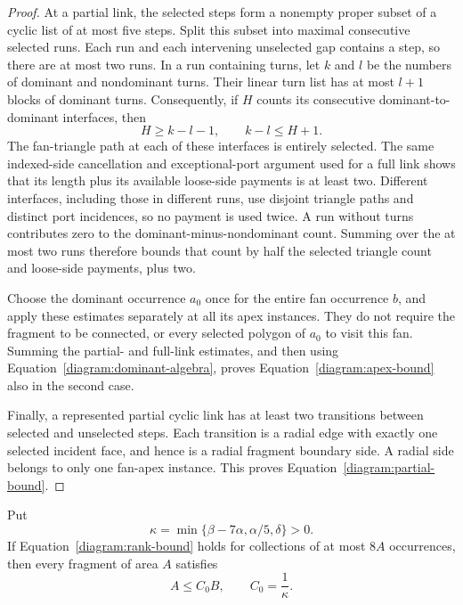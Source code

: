 \begin{proof}
At a partial link, the selected steps form a nonempty proper subset
of a cyclic list of at most five steps.  Split this subset into maximal
consecutive selected runs.  Each run and each intervening unselected
gap contains a step, so there are at most two runs.  In a run containing
turns, let $k$ and $l$ be the numbers of dominant and nondominant turns.
Their linear turn list has at most $l+1$ blocks of dominant turns.
Consequently, if $H$ counts its consecutive dominant-to-dominant
interfaces, then
\[
 H\ge k-l-1,\qquad k-l\le H+1.
\]
The fan-triangle path at each of these interfaces is entirely selected.
The same indexed-side cancellation and exceptional-port argument used
for a full link shows that its length plus its available loose-side
payments is at least two.  Different interfaces, including those in
different runs, use disjoint triangle paths and distinct port incidences,
so no payment is used twice.  A run without turns contributes zero to
the dominant-minus-nondominant count.  Summing over the at most two runs
therefore bounds that count by half the selected triangle count and
loose-side payments, plus two.

Choose the dominant occurrence $a_0$ once for the entire fan occurrence
$b$, and apply these estimates separately at all its apex instances.
They do not require the fragment to be connected, or every selected
polygon of $a_0$ to visit this fan.  Summing the partial- and full-link
estimates, and then using
Equation~\eqref{diagram:dominant-algebra}, proves
Equation~\eqref{diagram:apex-bound} also in the second case.

Finally, a represented partial cyclic link has at least two
transitions between selected and unselected steps.  Each transition
is a radial edge with exactly one selected incident face, and hence
is a radial fragment boundary side.  A radial side belongs to only one
fan-apex instance.  This proves
Equation~\eqref{diagram:partial-bound}.
\end{proof}

\begin{lemma}\label{diagram:fragment}
Put
\begin{equation}\label{diagram:kappa}
 \kappa=\min\{\beta-7\alpha,\alpha/5,\delta\}>0.
\end{equation}
If Equation~\eqref{diagram:rank-bound} holds for collections of at most
$8A$ occurrences, then every fragment of area $A$ satisfies
\begin{equation}\label{diagram:fragment-bound}
 A\le C_0 B,\qquad C_0=\frac{1}{\kappa}.
\end{equation}
\end{lemma}

